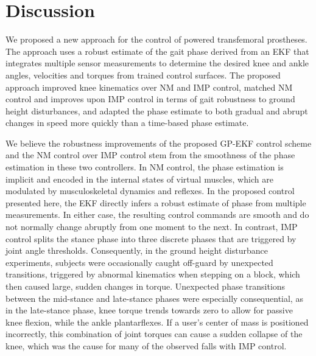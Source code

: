 \section{Discussion}\label{sec:discussion}

We proposed a new approach for the control of powered transfemoral prostheses.
The approach uses a robust estimate of the gait phase derived from an EKF that
integrates multiple sensor measurements to determine the desired knee and ankle
angles, velocities and torques from trained control surfaces. The proposed
approach improved knee kinematics over NM and IMP control, matched NM control
and improves upon IMP control in terms of gait robustness to ground height
disturbances, and adapted the phase estimate to both gradual and abrupt changes
in speed more quickly than a time-based phase estimate.

We believe the robustness improvements of the proposed GP-EKF control scheme and
the NM control over IMP control stem from the smoothness of the phase estimation
in these two controllers. In NM control, the phase estimation is implicit and
encoded in the internal states of virtual muscles, which are modulated by
musculoskeletal dynamics and reflexes. In the proposed control presented here,
the EKF directly infers a robust estimate of phase from multiple measurements.
In either case, the resulting control commands are smooth and do not normally
change abruptly from one moment to the next. In contrast, IMP control splits the
stance phase into three discrete phases that are triggered by joint angle
thresholds.  Consequently, in the ground height disturbance experiments,
subjects were occasionally caught off-guard by unexpected transitions, triggered
by abnormal kinematics when stepping on a block, which then caused large, sudden
changes in torque. Unexpected phase transitions between the mid-stance and
late-stance phases were especially consequential, as in the late-stance phase,
knee torque trends towards zero to allow for passive knee flexion, while the
ankle plantarflexes. If a user's center of mass is positioned incorrectly, this
combination of joint torques can cause a sudden collapse of the knee, which was
the cause for many of the observed falls with IMP control. 

